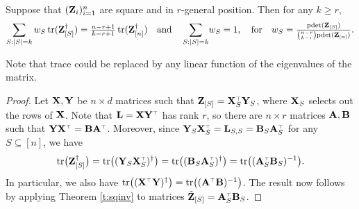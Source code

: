 \documentclass[12pt]{sty/colt2019/colt2018-arxiv}
\begin{document}
   \begin{theorem}\label{t:sqinv}
Suppose that $(\mathbf Z_i)_{i=1}^n$ are square and in $r$-general
position. Then for any $k\geq r$, 
     \begin{align*}
\sum_{S:|S|=k} w_S \,\mathrm{tr}(\mathbf Z_{[S]}^{\dagger}) =
       \tfrac{n-r+1}{k-r+1}\,\mathrm{tr}(\mathbf Z_{[n]}^{\dagger})\quad\text{and}\quad 
     \sum_{S:|S|=k}\!w_S = 1,\quad \text{for}\quad w_S=
\tfrac{\mathrm{pdet}(\mathbf Z_{[S]})}{{n-r\choose k-r}\mathrm{pdet}(\mathbf Z_{[n]})}.
     \end{align*}
   \end{theorem}
Note that trace could be replaced by any linear function of the eigenvalues
of the matrix. 
     \begin{proof}
Let $\mathbf X,\mathbf Y$ be $n\times d$ matrices such that
$\Z_{[S]}=\X_S^\top\Y_S$, where $\mathbf X_S$ selects out the rows of
$\mathbf X$. Note that $\L=\X\Y^\top$ has rank $r$, so there are $n\times r$
matrices $\mathbf A,\mathbf B$ such that $\Y\X^\top=\B\A^\top$. Moreover, since
       $\Y_S\X_S^\top=\L_{S,S}=\B_S\A_S^\top$ for any $S\subseteq [n]$, we have
       \begin{align*}
         \tr\big(\Z_{[S]}^\dagger\big) =
         \tr\big((\Y_S\X_S^\top)^\dagger\big) =
         \tr\big((\B_S\A_S^\top)^\dagger\big) = \tr\big((\A_S^\top\B_S)^{-1}\big).
       \end{align*}
       In particular, we also have $\tr\big((\X^\top\Y)^\dagger\big) =
       \tr\big((\A^\top\B)^{-1}\big)$. The result now follows by
       applying Theorem \ref{t:sqinv} to matrices $\tilde{\Z}_{[S]}=\A_S^\top\B_S$.
     \end{proof}

%


   
\end{document}
